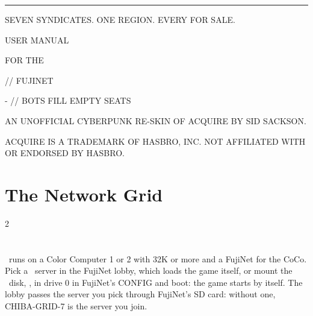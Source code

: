 \documentclass[12pt,letterpaper]{article}
\begin{document}
\begin{titlepage}
\machine
\vspace*{1.6in}
{\color{amber}\rule{\linewidth}{2pt}}\par\vspace{14pt}
{\fontsize{44}{48}\selectfont \game\par}\vspace{10pt}
{\fontsize{12}{16}\selectfont\color{steel} SEVEN SYNDICATES. ONE REGION. EVERY \MakeUppercase{} FOR SALE.\par}
\vspace{14pt}{\color{amber}\rule{\linewidth}{2pt}}\par
\vspace{0.35in}
{\fontsize{24}{30}\selectfont USER MANUAL\par}\vspace{4pt}
{\fontsize{14}{18}\selectfont\color{amber} FOR THE \MakeUppercase{\PlatformLong}\par}
\vspace{0.4in}
{\fontsize{12}{16}\selectfont \PlatformMachines \quad // \quad FUJINET\par
{}- \MakeUppercase{} \quad // \quad BOTS FILL EMPTY SEATS\par}
\vfill
{\fontsize{8.5}{11}\selectfont\color{steel}
AN UNOFFICIAL CYBERPUNK RE-SKIN OF ACQUIRE BY SID SACKSON.\par
ACQUIRE IS A TRADEMARK OF HASBRO, INC. NOT AFFILIATED WITH OR ENDORSED BY HASBRO.\par}
\end{titlepage}

\renewcommand{\secstatus}{THE SETTING \quad // \quad THE OBJECT \quad // \quad THE END}
\chapter{The Network Grid}
\begin{multicols}{2}
\end{multicols}

\renewcommand{\secstatus}{REGION \quad // \quad STATUS \quad // \quad HANDLE}
\chapter{}
\game\ runs on a Color Computer 1 or 2 with 32K or more and a FujiNet for the CoCo. Pick a \game\ server
in the FujiNet lobby, which loads the game itself, or mount the \game\ disk, , in
drive 0 in FujiNet's CONFIG and boot: the game starts by itself. The lobby passes the server you pick through FujiNet's SD card: without one,
CHIBA-GRID-7 is the server you join.
\end{document}

